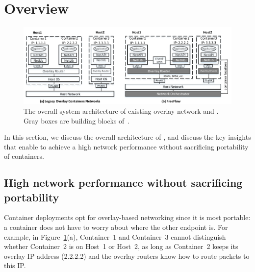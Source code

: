 \section{Overview} \label{sec:overview}

\begin{figure}[t!] 
     \centering 
     \includegraphics[width=7in]{figures/system-arch.pdf} 
    \caption{\label{fig:sysarch} The overall system architecture of existing overlay network and \sysname. Gray boxes are building blocks of~\sysname.}
\end{figure} 

In this section, we discuss the overall architecture of \sysname, and discuss the
key insights that enable \sysname to achieve a high network performance without
sacrificing portability of containers.

\subsection{High network performance without sacrificing portability}

Container deployments opt for overlay-based networking since it is most
portable: a container does not have to worry about where the other endpoint is.
For example, in Figure~\ref{fig:sysarch}(a), Container~1 and Container~3 cannot
distinguish whether Container~2 is on Host~1 or Host~2, as long as Container~2
keeps its overlay IP address (2.2.2.2) and the overlay routers know how to
route packets to this IP. 

